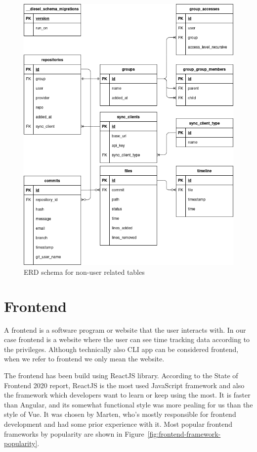 \begin{figure}[H]
    \includegraphics[width=\textwidth]{figures/erd_schema_general}
    \caption{ERD schema for non-user related tables}
    \label{fig:erd-schema-general}
\end{figure}

\section{Frontend}\label{sec:frontend}
A frontend is a software program or website that the user interacts with.
In our case frontend is a website where the user can see time tracking data according to the privileges.
Although technically also CLI app can be considered frontend, when we refer to frontend we only mean the website.

The frontend has been build using ReactJS library.
According to the State of Frontend 2020 report, ReactJS is the most used JavaScript framework and also the framework which developers want to learn or keep using the most.
It is faster than Angular, and its somewhat functional style was more pealing for us than the style of Vue.
It was chosen by Marten, who's mostly responsible for frontend development and had some prior experience with it.
Most popular frontend frameworks by popularity are shown in Figure~\ref{fig:frontend-framework-popularity}.

